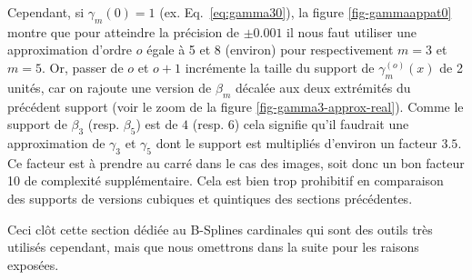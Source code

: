 \documentclass[11pt,twoside]{article}
\begin{document}
Cependant, si $\gamma_m(0)=1$ (ex. Eq.~\ref{eq:gamma30}), la figure \ref{fig-gammaappat0} montre que pour atteindre la précision de $\pm 0.001$ il nous faut utiliser une approximation d'ordre $o$ égale à 5 et 8 (environ) pour respectivement $m=3$ et $m=5$. Or, passer de $o$ et $o+1$ incrémente la taille du support de $\gamma_m^{(o)}(x)$ de 2 unités, car on rajoute une version de $\beta_m$ décalée aux deux extrémités du précédent support (voir le zoom de la figure \ref{fig-gamma3-approx-real}). Comme le support de $\beta_3$ (resp. $\beta_5$) est de $4$ (resp. $6$) cela signifie qu'il faudrait une approximation de $\gamma_3$ et $\gamma_5$ dont le support est multipliés d'environ un facteur $3.5$. Ce facteur est à prendre au carré dans le cas des images, soit donc un bon facteur 10 de complexité supplémentaire. Cela est bien trop prohibitif en comparaison des supports de versions cubiques et quintiques des sections précédentes. 

Ceci clôt cette section dédiée au B-Splines cardinales qui sont des outils très utilisés cependant, mais que nous omettrons dans la suite pour les raisons exposées.
%
%
\end{document}
